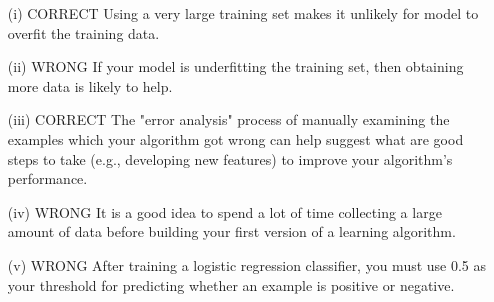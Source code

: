\documentclass[11pt]{article} %
\begin{document}
\begin{itemize}
\item[(i)] CORRECT Using a very large training set makes it unlikely for model to overfit the training data.
	
	
\item[(ii)] 	WRONG If your model is underfitting the training set, then obtaining more data is likely to help.
	
\item[(iii)] 	CORRECT The "error analysis" process of manually examining the examples which your algorithm got wrong	can help suggest what are good steps to take (e.g., developing new features) to improve your algorithm's performance.
	
	
	
\item[(iv)]	WRONG It is a good idea to spend a lot of time collecting a large amount of data before building your first version of a learning algorithm.
	
	
	
\item[(v)] WRONG After training a logistic regression classifier, you must use 0.5 as your threshold for predicting whether an example is positive or	negative.
\end{itemize}
\end{document}
